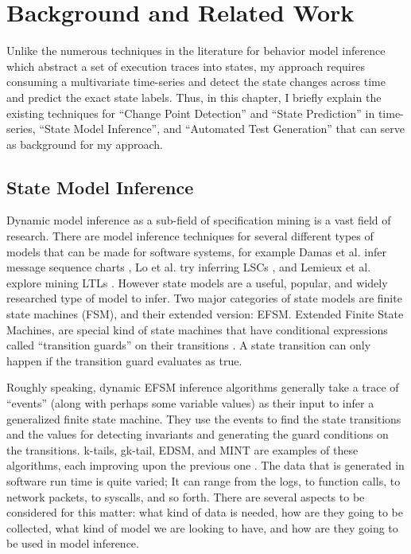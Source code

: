 \chapter{Background and Related Work} \label{sec:background}
Unlike the numerous techniques in the literature for behavior model inference \cite{lang1998results, walkinshaw2016inferring, Lo2007Mining, dallmeier2006mining} which abstract a set of execution traces into states, my approach requires consuming a multivariate time-series and detect the state changes across time and predict the exact state labels. Thus, in this chapter, I briefly explain the existing techniques for ``Change Point Detection'' and ``State Prediction'' in time-series, ``State Model Inference'', and ``Automated Test Generation'' that can serve as background for my approach. 

\section{State Model Inference}
Dynamic model inference as a sub-field of specification mining is a vast field of research.
There are model inference techniques for several different types of models that can be made for software systems, for example Damas et al. infer message sequence charts \cite{damas2005generating}, Lo et al. try inferring LSCs \cite{Lo2007Mining}, and Lemieux et al. explore mining LTLs \cite{lemieux2015general}. However state models are a useful, popular, and widely researched type of model to infer. Two major categories of state models are finite state machines (FSM), and their extended version: EFSM. Extended Finite State Machines, are special kind of state machines that have conditional expressions called ``transition guards'' on their transitions \cite{lorenzoli2008automatic}. A state transition can only happen if the transition guard evaluates as true.

Roughly speaking, dynamic EFSM inference algorithms generally take a trace of ``events'' (along with perhaps some variable values) as their input \cite{walkinshaw2016inferring} to infer a generalized finite state machine. They use the events to find the state transitions and the values for detecting invariants and generating the guard conditions on the transitions. 
k-tails, gk-tail, EDSM, and MINT are examples of these algorithms, each improving upon the previous one \cite{biermann1972synthesis, lorenzoli2008automatic, lang1998results, walkinshaw2016inferring}.  %
The data that is generated in software run time is quite varied; It can range from the logs, to function calls, to network packets, to syscalls, and so forth. There are several aspects to be considered for this matter: what kind of data is needed, how are they going to be collected, what kind of model we are looking to have, and how are they going to be used in model inference. 

